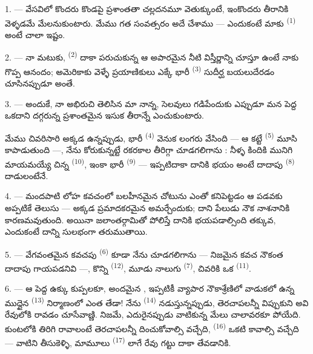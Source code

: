\VUsaut{4.0mm}
\VUsaut{3.0mm}
\VUsaut{3.0mm}

1. --- వేసవిలో కొందరు కొండపై ప్రశాంతతా చల్లదనమూ వెతుక్కుంటే, ఇంకొందరు తీరానికి వెళ్ళడమే
మేలనుకుంటారు. మేము గత సంవత్సరం అదే చేశాము — ఎందుకంటే మాకు 
\textsuperscript{(1)} అంటే చాలా ఇష్టం.

2. --- నా మటుకు,  \textsuperscript{(2)} దాకా పరుచుకున్న ఆ అపారమైన నీటి
విస్తీర్ణాన్ని చూస్తూ ఉంటే నాకు గొప్ప ఆనందం; అమెరికాకు వెళ్ళే ప్రయాణికులు ఎక్కే భారీ
 \textsuperscript{(3)} సుదీర్ఘ  బయలుదేరడం
చూసినప్పుడూ అంతే.

3. --- అందుకే, నా అభిరుచి తెలిసిన మా నాన్న, సెలవులు గడిపేందుకు ఎప్పుడూ మన పెద్ద
 ఒకదాని దగ్గరున్న ప్రశాంతమైన ఇసుక తీరాన్నే ఎంచుకుంటారు.

మేము చివరిసారి అక్కడ ఉన్నప్పుడు,  భారీ 
\textsuperscript{(4)} వెనుక లంగరు వేసింది — ఆ కట్టే 
\textsuperscript{(5)} మూసి కాపాడుతుంది —, నేను కోరుకున్నట్టే రకరకాల 
తీరిగ్గా చూడగలిగాను : నీళ్ళ కిందికి మునిగి మాయమయ్యే చిన్న 
\textsuperscript{(10)}, ఇంకా భారీ  \textsuperscript{(9)} — ఇప్పటిదాకా
దానికి భయం అంటే దాదాపు  \textsuperscript{(8)} దాడులంటేనే.

\VUsaut{5.0mm}
\VUsaut{3.4mm}

4. --- మందపాటి లోహ కవచంలో బలహీనమైన చోటును ఎంతో  కనిపెట్టడం ఆ పడవకు
అప్పటికే తెలుసు — అక్కడ ప్రమాదకరమైన  అమర్చేందుకు; దాని పేలుడు నౌక
నాశనానికి కారణమవుతుంది. అయినా జలాంతర్గామితో పోలిస్తే దానికి భయపడాల్సింది తక్కువ, ఎందుకంటే
 దాన్ని సులభంగా తరుముతాయి.

5. --- వేగవంతమైన కవచపు  \textsuperscript{(6)} కూడా నేను చూడగలిగాను
— నిజమైన కవచ నౌకంత దాదాపు గాయపడనివి —, కొన్ని 
\textsuperscript{(12)}, మూడు నాలుగు  \textsuperscript{(7)}, చివరికి ఒక
 \textsuperscript{(11)}.

6. --- ఆ పెద్ద ఉక్కు కుప్పలకూ, అందమైన , ఇప్పటికీ వ్యాపార
నౌకాశ్రేణిలో వాడుకలో ఉన్న ముద్దైన  \textsuperscript{(13)} నిర్మాణంలో
ఎంత తేడా! నేను  \textsuperscript{(14)} నడుస్తున్నప్పుడు, తెరచాపలన్నీ
విప్పుకుని అవి రేవులోకి రావడం చూసేవాణ్ణి. నిజమే,  ఎదురైనప్పుడు వాటికున్న మేలు
చాలావరకూ పోయేది. కుంటలోకి తిరిగి రావాలంటే తెరచాపలన్నీ దించుకోవాల్సి వచ్చేది,
 \textsuperscript{(16)} ఒకటి కావాల్సి వచ్చేది — వాటిని తీసుకెళ్ళి,
మామూలు  \textsuperscript{(17)} లాగే రేవు గట్టు దాకా తేవడానికి.


